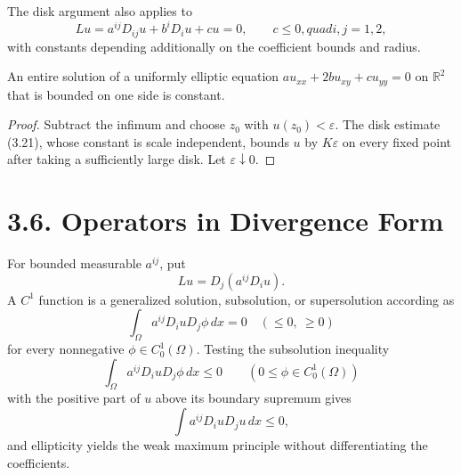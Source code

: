 The disk argument also applies to
\begin{equation}
\tag{3.27}
Lu=a^{ij}D_{ij}u+b^iD_i u+cu=0,
\qquad c\leq0,quad i,j=1,2,
\end{equation}
with constants depending additionally on the coefficient bounds and radius.

\begin{corollary}\label{gt-ch3-liouville}
An entire solution of a uniformly elliptic equation
$au_{xx}+2bu_{xy}+cu_{yy}=0$ on $\mathbb R^2$ that is bounded on one side is
constant.
\end{corollary}
\begin{proof}
\sketch Subtract the infimum and choose $z_0$ with $u(z_0)<\varepsilon$.
The disk estimate (3.21), whose constant is scale independent, bounds $u$ by
$K\varepsilon$ on every fixed point after taking a sufficiently large disk.
Let $\varepsilon\downarrow0$.
\end{proof}

\section*{3.6. Operators in Divergence Form}

For bounded measurable $a^{ij}$, put
\begin{equation}
\tag{3.28}
Lu=D_j(a^{ij}D_i u).
\end{equation}
A $C^1$ function is a generalized solution, subsolution, or supersolution
according as
\begin{equation}
\tag{3.29}
\int_\Omega a^{ij}D_i uD_j\phi\,dx=0\quad(\leq0,\ \geq0)
\end{equation}
for every nonnegative $\phi\in C_0^1(\Omega)$. Testing the subsolution
inequality
\begin{equation}
\tag{3.30}
\int_\Omega a^{ij}D_i uD_j\phi\,dx\leq0
\qquad(0\leq\phi\in C_0^1(\Omega))
\end{equation}
with the positive part of $u$ above its boundary supremum gives
\[
\int a^{ij}D_i uD_j u\,dx\leq0,
\]
and ellipticity yields the weak maximum principle without differentiating
the coefficients.
